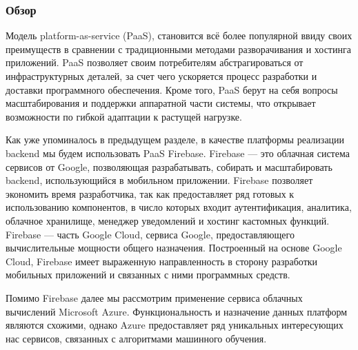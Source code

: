 \subsubsection{Обзор}
Модель platform-as-service (PaaS), становится всё более популярной ввиду своих преимуществ в сравнении с традиционными методами разворачивания и хостинга приложений. PaaS позволяет своим потребителям абстрагироваться от инфраструктурных деталей, за счет чего ускоряется процесс разработки и доставки программного обеспечения. Кроме того, PaaS берут на себя вопросы масштабирования и поддержки аппаратной части системы, что открывает возможности по гибкой адаптации к растущей нагрузке.

Как уже упоминалось в предыдущем разделе, в качестве платформы реализации backend мы будем использовать PaaS Firebase\cite{firebase-overview}. Firebase --- это облачная система сервисов от Google, позволяющая разрабатывать, собирать и масштабировать backend, использующийся в мобильном приложении. Firebase позволяет экономить время разработчика, так как предоставляет ряд готовых к использованию компонентов, в число которых входит аутентификация, аналитика, облачное хранилище, менеджер уведомлений и хостинг кастомных функций. Firebase --- часть Google Cloud, сервиса Google, предоставляющего вычислительные мощности общего назначения. Построенный на основе Google Cloud, Firebase имеет выраженную направленность в сторону разработки мобильных приложений и связанных с ними программных средств.

Помимо Firebase далее мы рассмотрим применение сервиса облачных вычислений Microsoft Azure\cite{azure-cognitive-services}. Функциональность и назначение данных платформ являются схожими, однако Azure предоставляет ряд уникальных интересующих нас сервисов, связанных с алгоритмами машинного обучения.

